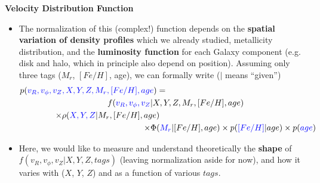 \documentclass[letterpaper,landscape]{slides}
\begin{document}

\begin{slide}

\begin{center}
\bfseries
\large {} Velocity Distribution Function
\end{center}
\vskip 0.2in
\begin{itemize}
\item The normalization of this (complex!) function depends on the 
{\bf spatial variation of density profiles} which we already studied, 
metallicity distribution, 
and the {\bf luminosity function} for each Galaxy component (e.g. 
disk and halo, which in principle also depend on position). Assuming
only three tags ($M_r$, $[Fe/H]$, age), we can formally write 
($|$ means ``given'')
\begin{eqnarray}
 p({\color{blue}v_R, v_\phi, v_Z, X,Y,Z, M_r, [Fe/H], age}) = \hskip 2.5in \nonumber \\
      \phantom{x} f({\color{blue}v_R, v_\phi, v_Z } | X,Y,Z, M_r, [Fe/H], age) \hskip 1.2in \nonumber \\
      \times \rho({\color{blue}X,Y,Z }| M_r, [Fe/H], age) \hskip 2.6in \nonumber \\
      \times \Phi({\color{blue}M_r } | [Fe/H], age) 
      \times p({\color{blue}[Fe/H] } | age) 
      \times p({\color{blue} age}) \nonumber  
\end{eqnarray}
\item Here, we would like to measure and understand theoretically the {\bf shape} of
$f(v_R, v_\phi, v_Z | X,Y,Z,tags)$ (leaving normalization aside for now), and 
how it varies with ($X$, $Y$, $Z$) and as a function of various $tags$.
\end{itemize}    

\vfill
\end{slide}


\end{document}
